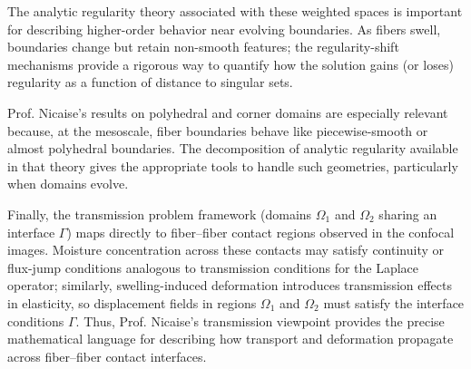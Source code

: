 \documentclass[11pt]{article}
\begin{document}
The analytic regularity theory associated with these weighted spaces is important for describing higher-order behavior near evolving boundaries. As fibers swell, boundaries change but retain non-smooth features; the regularity-shift mechanisms provide a rigorous way to quantify how the solution gains (or loses) regularity as a function of distance to singular sets.

Prof. Nicaise’s results on polyhedral and corner domains are especially relevant because, at the mesoscale, fiber boundaries behave like piecewise-smooth or almost polyhedral boundaries. The decomposition of analytic regularity available in that theory gives the appropriate tools to handle such geometries, particularly when domains evolve.

Finally, the transmission problem framework (domains $\Omega_1$ and $\Omega_2$ sharing an interface $\Gamma$) maps directly to fiber–fiber contact regions observed in the confocal images. Moisture concentration across these contacts may satisfy continuity or flux-jump conditions analogous to transmission conditions for the Laplace operator; similarly, swelling-induced deformation introduces transmission effects in elasticity, so displacement fields in regions $\Omega_1$ and $\Omega_2$ must satisfy the interface conditions $\Gamma$. Thus, Prof. Nicaise's transmission viewpoint provides the precise mathematical language for describing how transport and deformation propagate across fiber–fiber contact interfaces.
\end{document}
